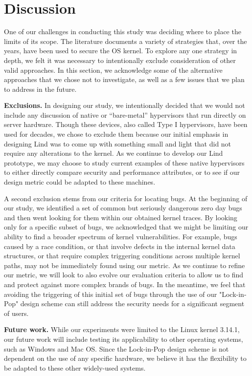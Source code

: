 \section{Discussion}
\label{sec.limitation}

One of our challenges in conducting this study was deciding where to place the
limits of its scope. The literature documents a variety of strategies that, over
the years, have been used to secure the OS kernel. To explore any one strategy
in depth, we felt it was necessary to intentionally exclude consideration of
other valid approaches. In this section, we acknowledge some of the alternative
approaches that we chose not to investigate, as well as a few issues that we plan
to address in the future.

\textbf{Exclusions.}
In designing our study, we intentionally decided that we would not include any
discussion of native or “bare-metal” hypervisors that run directly on server
hardware. Though these devices, also called Type I hypervisors, have been used
for decades, we chose to exclude them because our initial emphasis in designing
Lind was to come up with something small and light that did not require any
alterations to the kernel. As we continue to develop our Lind prototype, we may
choose to study current examples of these native hypervisors to either directly
compare security and performance attributes, or to see if our design metric could
be adapted to these machines.

A second exclusion stems from our criteria for locating bugs. At the beginning
of our study, we identified a set of common but seriously dangerous zero day bugs
and then went looking for them within our obtained kernel traces. By looking only
for a specific subset of bugs, we acknowledged that we might be limiting our
ability to find a broader spectrum of kernel vulnerabilities. For example, bugs
caused by a race condition, or that involve defects in the internal kernel data
structures, or that require complex triggering conditions across multiple kernel
paths, may not be immediately found using our metric. As we continue to refine
our metric, we will look to also evolve our evaluation
criteria to allow us to find and protect against more complex brands of bugs.
In the meantime, we feel that avoiding the triggering of this initial set of bugs
through the use of our "Lock-in-Pop" design scheme can still address the security
needs for a significant segment of users.

\textbf{Future work.}
While our experiments were limited to the Linux kernel 3.14.1, our future work
will include testing its applicability to other operating systems, such as
Windows and Mac OS. Since the Lock-in-Pop design scheme is not dependent on the use of any
specific hardware, we believe it has the flexibility to be adapted to these other
widely-used systems.

